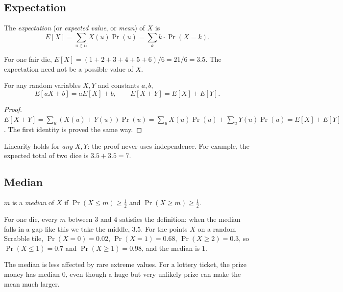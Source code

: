 \subsection{Expectation}
\label{sec:10-3}

\begin{definition}[Expectation]
The \emph{expectation} (or \emph{expected value}, or \emph{mean}) of $X$ is
\[
E[X] = \sum_{u\in U} X(u)\Pr(u) = \sum_k k\cdot\Pr(X=k).
\]
\end{definition}

\begin{example}
For one fair die, $E[X]=(1+2+3+4+5+6)/6=21/6=3.5$. The expectation need not be a possible value of $X$.
\end{example}

\begin{theorem}
For any random variables $X,Y$ and constants $a,b$,
\[
E[aX+b] = aE[X]+b, \qquad E[X+Y] = E[X]+E[Y].
\]
\end{theorem}
\begin{proof}
$E[X+Y] = \sum_{u}(X(u)+Y(u))\Pr(u) = \sum_u X(u)\Pr(u) + \sum_u Y(u)\Pr(u) = E[X]+E[Y]$. The first identity is proved the same way.
\end{proof}

\begin{note}
Linearity holds for \emph{any} $X,Y$: the proof never uses independence. For example, the expected total of two dice is $3.5+3.5=7$.
\end{note}

\subsection{Median}
\label{sec:10-4}

\begin{definition}[Median]
$m$ is a \emph{median} of $X$ if $\Pr(X\le m)\ge\tfrac12$ and $\Pr(X\ge m)\ge\tfrac12$.
\end{definition}

\begin{example}
For one die, every $m$ between $3$ and $4$ satisfies the definition; when the median falls in a gap like this we take the middle, $3.5$. For the points $X$ on a random Scrabble tile, $\Pr(X=0)=0.02$, $\Pr(X=1)=0.68$, $\Pr(X\ge2)=0.3$, so $\Pr(X\le1)=0.7$ and $\Pr(X\ge1)=0.98$, and the median is $1$.
\end{example}

\begin{note}
The median is less affected by rare extreme values. For a lottery ticket, the prize money has median $0$, even though a huge but very unlikely prize can make the mean much larger.
\end{note}

